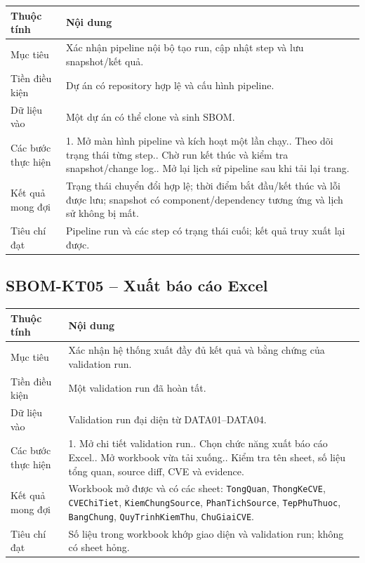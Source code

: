 \documentclass[12pt,a4paper]{article}
\newcommand{\code}[1]{\texttt{#1}}
\begin{document}
\begin{longtable}{|L{3.4cm}|L{11.2cm}|}
  \hline
  \textbf{Thuộc tính} & \textbf{Nội dung} \\ \hline
  Mục tiêu & Xác nhận pipeline nội bộ tạo run, cập nhật step và lưu snapshot/kết quả. \\ \hline
  Tiền điều kiện & Dự án có repository hợp lệ và cấu hình pipeline. \\ \hline
  Dữ liệu vào & Một dự án có thể clone và sinh SBOM. \\ \hline
  Các bước thực hiện &
  1. Mở màn hình pipeline và kích hoạt một lần chạy.. Theo dõi trạng thái từng step.. Chờ run kết thúc và kiểm tra snapshot/change log.. Mở lại lịch sử pipeline sau khi tải lại trang. \\ \hline
  Kết quả mong đợi & Trạng thái chuyển đổi hợp lệ; thời điểm bắt đầu/kết thúc và lỗi được
  lưu; snapshot có component/dependency tương ứng và lịch sử không bị mất. \\ \hline
  Tiêu chí đạt & Pipeline run và các step có trạng thái cuối; kết quả truy xuất lại được. \\ \hline
\end{longtable}

\subsection{SBOM-KT05 -- Xuất báo cáo Excel}

\begin{longtable}{|L{3.4cm}|L{11.2cm}|}
  \hline
  \textbf{Thuộc tính} & \textbf{Nội dung} \\ \hline
  Mục tiêu & Xác nhận hệ thống xuất đầy đủ kết quả và bằng chứng của validation run. \\ \hline
  Tiền điều kiện & Một validation run đã hoàn tất. \\ \hline
  Dữ liệu vào & Validation run đại diện từ DATA01--DATA04. \\ \hline
  Các bước thực hiện &
  1. Mở chi tiết validation run.. Chọn chức năng xuất báo cáo Excel.. Mở workbook vừa tải xuống.. Kiểm tra tên sheet, số liệu tổng quan, source diff, CVE và evidence. \\ \hline
  Kết quả mong đợi & Workbook mở được và có các sheet:
  \code{TongQuan}, \code{ThongKeCVE}, \code{CVEChiTiet},
  \code{KiemChungSource}, \code{PhanTichSource}, \code{TepPhuThuoc},
  \code{BangChung}, \code{QuyTrinhKiemThu}, \code{ChuGiaiCVE}. \\ \hline
  Tiêu chí đạt & Số liệu trong workbook khớp giao diện và validation run; không có sheet hỏng. \\ \hline
\end{longtable}
\end{document}
